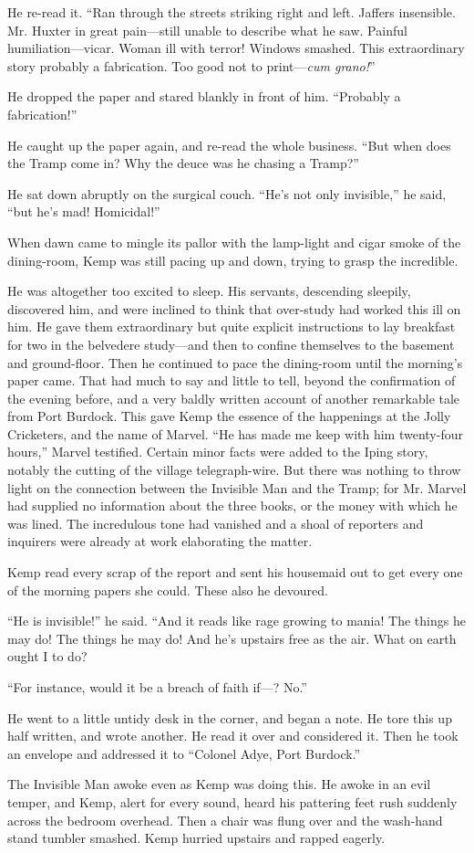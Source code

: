 He re-read it. “Ran through the streets striking right and left. Jaffers insensible. Mr. Huxter in great pain—still unable to describe what he saw. Painful humiliation—vicar. Woman ill with terror! Windows smashed. This extraordinary story probably a fabrication. Too good not to print—\emph{cum grano!}”

He dropped the paper and stared blankly in front of him. “Probably a fabrication!”

He caught up the paper again, and re-read the whole business. “But when does the Tramp come in? Why the deuce was he chasing a Tramp?”

He sat down abruptly on the surgical couch. “He’s not only invisible,” he said, “but he’s mad! Homicidal!”

When dawn came to mingle its pallor with the lamp-light and cigar smoke of the dining-room, Kemp was still pacing up and down, trying to grasp the incredible.

He was altogether too excited to sleep. His servants, descending sleepily, discovered him, and were inclined to think that over-study had worked this ill on him. He gave them extraordinary but quite explicit instructions to lay breakfast for two in the belvedere study—and then to confine themselves to the basement and ground-floor. Then he continued to pace the dining-room until the morning’s paper came. That had much to say and little to tell, beyond the confirmation of the evening before, and a very baldly written account of another remarkable tale from Port Burdock. This gave Kemp the essence of the happenings at the Jolly Cricketers, and the name of Marvel. “He has made me keep with him twenty-four hours,” Marvel testified. Certain minor facts were added to the Iping story, notably the cutting of the village telegraph-wire. But there was nothing to throw light on the connection between the Invisible Man and the Tramp; for Mr. Marvel had supplied no information about the three books, or the money with which he was lined. The incredulous tone had vanished and a shoal of reporters and inquirers were already at work elaborating the matter.

Kemp read every scrap of the report and sent his housemaid out to get every one of the morning papers she could. These also he devoured.

“He is invisible!” he said. “And it reads like rage growing to mania! The things he may do! The things he may do! And he’s upstairs free as the air. What on earth ought I to do?

“For instance, would it be a breach of faith if—? No.”

He went to a little untidy desk in the corner, and began a note. He tore this up half written, and wrote another. He read it over and considered it. Then he took an envelope and addressed it to “Colonel Adye, Port Burdock.”

The Invisible Man awoke even as Kemp was doing this. He awoke in an evil temper, and Kemp, alert for every sound, heard his pattering feet rush suddenly across the bedroom overhead. Then a chair was flung over and the wash-hand stand tumbler smashed. Kemp hurried upstairs and rapped eagerly.